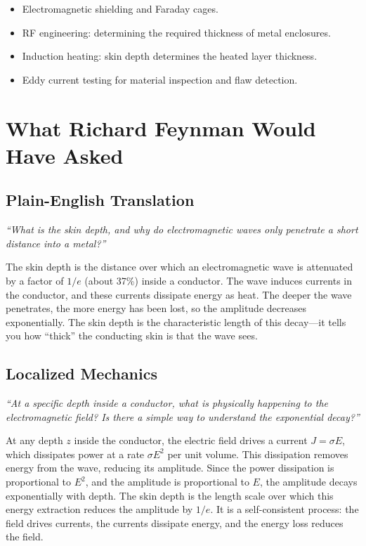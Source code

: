 \begin{itemize}
    \item Electromagnetic shielding and Faraday cages.
    \item RF engineering: determining the required thickness of metal enclosures.
    \item Induction heating: skin depth determines the heated layer thickness.
    \item Eddy current testing for material inspection and flaw detection.
\end{itemize}
\section*{What Richard Feynman Would Have Asked}

\subsection*{Plain-English Translation}
\textit{``What is the skin depth, and why do electromagnetic waves only penetrate a short distance into a metal?''}

The skin depth is the distance over which an electromagnetic wave is attenuated by a factor of $1/e$ (about 37\%) inside a conductor. The wave induces currents in the conductor, and these currents dissipate energy as heat. The deeper the wave penetrates, the more energy has been lost, so the amplitude decreases exponentially. The skin depth is the characteristic length of this decay---it tells you how ``thick'' the conducting skin is that the wave sees.

\subsection*{Localized Mechanics}
\textit{``At a specific depth inside a conductor, what is physically happening to the electromagnetic field? Is there a simple way to understand the exponential decay?''}

At any depth $z$ inside the conductor, the electric field drives a current $J = \sigma E$, which dissipates power at a rate $\sigma E^2$ per unit volume. This dissipation removes energy from the wave, reducing its amplitude. Since the power dissipation is proportional to $E^2$, and the amplitude is proportional to $E$, the amplitude decays exponentially with depth. The skin depth is the length scale over which this energy extraction reduces the amplitude by $1/e$. It is a self-consistent process: the field drives currents, the currents dissipate energy, and the energy loss reduces the field.

